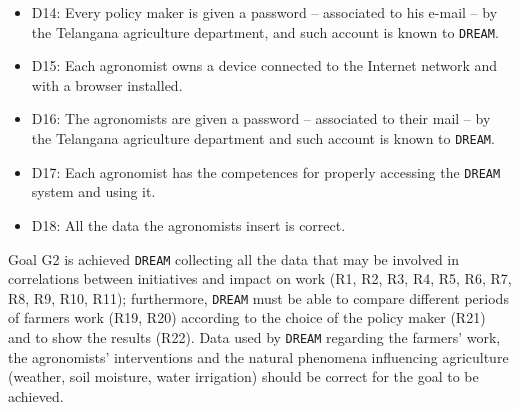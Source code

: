 \documentclass{article}
\begin{document}
\begin{itemize}
    \item D14: Every policy maker is given a password – associated to his e-mail – by the Telangana agriculture department, and such account is known to \verb|DREAM|.
  
    \item D15: Each agronomist owns a device connected to the Internet network and with a browser installed.
  
    \item D16: The agronomists are given a password – associated to their mail – by the Telangana agriculture department and such account is known to \verb|DREAM|.
  
    \item D17: Each agronomist has the competences for properly accessing the \verb|DREAM| system and using it.
   
    \item D18: All the data the agronomists insert is correct.
\end{itemize}

Goal G2 is achieved \verb|DREAM| collecting all the data that may be involved in correlations between initiatives and impact on work (R1, R2, R3, R4, R5, R6, R7, R8, R9, R10, R11); furthermore, \verb|DREAM| must be able to compare different periods of farmers work (R19, R20) according to the choice of the policy maker (R21) and to show the results (R22).
Data used by \verb|DREAM| regarding the farmers' work, the agronomists' interventions and the natural phenomena influencing agriculture (weather, soil moisture, water irrigation) should be correct for the goal to be achieved.

\vspace{5mm}
\end{document}
